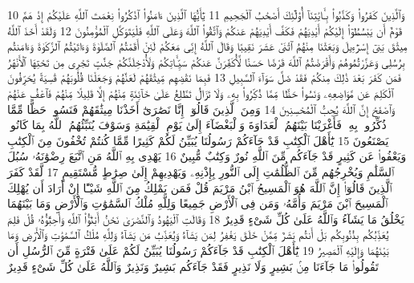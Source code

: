 {\tiny\colorbox{cl_aya}{10}} وَٱلَّذِينَ كَفَرُوا۟ وَكَذَّبُوا۟ بِـَٔايَٰتِنَآ أُو۟لَٰٓئِكَ أَصْحَٰبُ ٱلْجَحِيمِ
{\tiny\colorbox{cl_aya}{11}} يَٰٓأَيُّهَا ٱلَّذِينَ ءَامَنُوا۟ ٱذْكُرُوا۟ نِعْمَتَ ٱللَّهِ عَلَيْكُمْ إِذْ هَمَّ قَوْمٌ أَن يَبْسُطُوٓا۟ إِلَيْكُمْ أَيْدِيَهُمْ فَكَفَّ أَيْدِيَهُمْ عَنكُمْ وَٱتَّقُوا۟ ٱللَّهَ وَعَلَى ٱللَّهِ فَلْيَتَوَكَّلِ ٱلْمُؤْمِنُونَ
{\tiny\colorbox{cl_aya}{12}} وَلَقَدْ أَخَذَ ٱللَّهُ مِيثَٰقَ بَنِىٓ إِسْرَٰٓءِيلَ وَبَعَثْنَا مِنْهُمُ ٱثْنَىْ عَشَرَ نَقِيبًا وَقَالَ ٱللَّهُ إِنِّى مَعَكُمْ لَئِنْ أَقَمْتُمُ ٱلصَّلَوٰةَ وَءَاتَيْتُمُ ٱلزَّكَوٰةَ وَءَامَنتُم بِرُسُلِى وَعَزَّرْتُمُوهُمْ وَأَقْرَضْتُمُ ٱللَّهَ قَرْضًا حَسَنًا لَّأُكَفِّرَنَّ عَنكُمْ سَيِّـَٔاتِكُمْ وَلَأُدْخِلَنَّكُمْ جَنَّٰتٍ تَجْرِى مِن تَحْتِهَا ٱلْأَنْهَٰرُ فَمَن كَفَرَ بَعْدَ ذَٰلِكَ مِنكُمْ فَقَدْ ضَلَّ سَوَآءَ ٱلسَّبِيلِ
{\tiny\colorbox{cl_aya}{13}} فَبِمَا نَقْضِهِم مِّيثَٰقَهُمْ لَعَنَّٰهُمْ وَجَعَلْنَا قُلُوبَهُمْ قَٰسِيَةً يُحَرِّفُونَ ٱلْكَلِمَ عَن مَّوَاضِعِهِۦ وَنَسُوا۟ حَظًّا مِّمَّا ذُكِّرُوا۟ بِهِۦ وَلَا تَزَالُ تَطَّلِعُ عَلَىٰ خَآئِنَةٍ مِّنْهُمْ إِلَّا قَلِيلًا مِّنْهُمْ فَٱعْفُ عَنْهُمْ وَٱصْفَحْ إِنَّ ٱللَّهَ يُحِبُّ ٱلْمُحْسِنِينَ
{\tiny\colorbox{cl_aya}{14}} وَمِنَ ٱلَّذِينَ قَالُوٓا۟ إِنَّا نَصَٰرَىٰٓ أَخَذْنَا مِيثَٰقَهُمْ فَنَسُوا۟ حَظًّا مِّمَّا ذُكِّرُوا۟ بِهِۦ فَأَغْرَيْنَا بَيْنَهُمُ ٱلْعَدَاوَةَ وَٱلْبَغْضَآءَ إِلَىٰ يَوْمِ ٱلْقِيَٰمَةِ وَسَوْفَ يُنَبِّئُهُمُ ٱللَّهُ بِمَا كَانُوا۟ يَصْنَعُونَ
{\tiny\colorbox{cl_aya}{15}} يَٰٓأَهْلَ ٱلْكِتَٰبِ قَدْ جَآءَكُمْ رَسُولُنَا يُبَيِّنُ لَكُمْ كَثِيرًا مِّمَّا كُنتُمْ تُخْفُونَ مِنَ ٱلْكِتَٰبِ وَيَعْفُوا۟ عَن كَثِيرٍ قَدْ جَآءَكُم مِّنَ ٱللَّهِ نُورٌ وَكِتَٰبٌ مُّبِينٌ
{\tiny\colorbox{cl_aya}{16}} يَهْدِى بِهِ ٱللَّهُ مَنِ ٱتَّبَعَ رِضْوَٰنَهُۥ سُبُلَ ٱلسَّلَٰمِ وَيُخْرِجُهُم مِّنَ ٱلظُّلُمَٰتِ إِلَى ٱلنُّورِ بِإِذْنِهِۦ وَيَهْدِيهِمْ إِلَىٰ صِرَٰطٍ مُّسْتَقِيمٍ
{\tiny\colorbox{cl_aya}{17}} لَّقَدْ كَفَرَ ٱلَّذِينَ قَالُوٓا۟ إِنَّ ٱللَّهَ هُوَ ٱلْمَسِيحُ ٱبْنُ مَرْيَمَ قُلْ فَمَن يَمْلِكُ مِنَ ٱللَّهِ شَيْـًٔا إِنْ أَرَادَ أَن يُهْلِكَ ٱلْمَسِيحَ ٱبْنَ مَرْيَمَ وَأُمَّهُۥ وَمَن فِى ٱلْأَرْضِ جَمِيعًا وَلِلَّهِ مُلْكُ ٱلسَّمَٰوَٰتِ وَٱلْأَرْضِ وَمَا بَيْنَهُمَا يَخْلُقُ مَا يَشَآءُ وَٱللَّهُ عَلَىٰ كُلِّ شَىْءٍ قَدِيرٌ
{\tiny\colorbox{cl_aya}{18}} وَقَالَتِ ٱلْيَهُودُ وَٱلنَّصَٰرَىٰ نَحْنُ أَبْنَٰٓؤُا۟ ٱللَّهِ وَأَحِبَّٰٓؤُهُۥ قُلْ فَلِمَ يُعَذِّبُكُم بِذُنُوبِكُم بَلْ أَنتُم بَشَرٌ مِّمَّنْ خَلَقَ يَغْفِرُ لِمَن يَشَآءُ وَيُعَذِّبُ مَن يَشَآءُ وَلِلَّهِ مُلْكُ ٱلسَّمَٰوَٰتِ وَٱلْأَرْضِ وَمَا بَيْنَهُمَا وَإِلَيْهِ ٱلْمَصِيرُ
{\tiny\colorbox{cl_aya}{19}} يَٰٓأَهْلَ ٱلْكِتَٰبِ قَدْ جَآءَكُمْ رَسُولُنَا يُبَيِّنُ لَكُمْ عَلَىٰ فَتْرَةٍ مِّنَ ٱلرُّسُلِ أَن تَقُولُوا۟ مَا جَآءَنَا مِنۢ بَشِيرٍ وَلَا نَذِيرٍ فَقَدْ جَآءَكُم بَشِيرٌ وَنَذِيرٌ وَٱللَّهُ عَلَىٰ كُلِّ شَىْءٍ قَدِيرٌ
